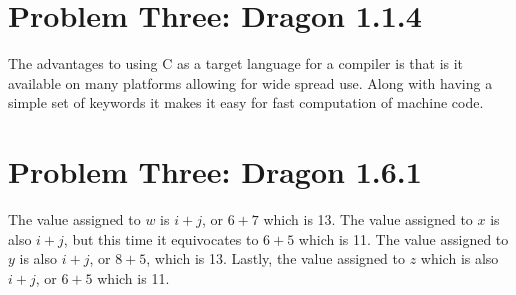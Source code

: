 \documentclass[letterpaper, 10pt,DIV=13]{scrartcl}
\numberwithin{equation}{section} %
\numberwithin{figure}{section} %
\numberwithin{table}{section} %
\begin{document}
\section{Problem Three: Dragon 1.1.4}

The advantages to using C as a target language for a compiler is that is it available on many platforms allowing for wide spread use. Along with having a simple set of keywords it makes it easy for fast computation of machine code.

\section{Problem Three: Dragon 1.6.1}

The value assigned to $w$ is $i+j$, or $6+7$ which is 13. The value assigned to $x$ is also $i+j$, but this time it equivocates to $6+5$ which is 11. The value assigned to $y$ is also $i+j$, or $8+5$, which is 13. Lastly, the value assigned to $z$ which is also $i+j$, or $6+5$ which is 11.


 

\pagebreak
\end{document}
